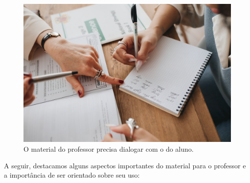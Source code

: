 \begin{figure}[t]
\centering
\includegraphics[width=\textwidth]{./imgs/Imagem010.jpg}
\caption{O material do professor precisa dialogar com o do aluno.}
\end{figure}

A seguir, destacamos alguns aspectos importantes do material para o
professor e a importância de ser orientado sobre seu uso:

